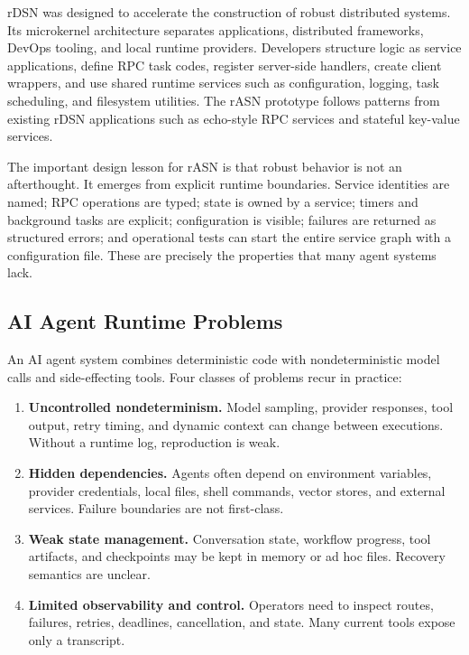 \documentclass[manuscript,screen,review]{acmart}
\newcommand{\rasn}{rASN\xspace}
\newcommand{\rdsn}{rDSN\xspace}
\begin{document}
\rdsn was designed to accelerate the construction of robust distributed
systems. Its microkernel architecture separates applications, distributed
frameworks, DevOps tooling, and local runtime providers. Developers structure
logic as service applications, define RPC task codes, register server-side
handlers, create client wrappers, and use shared runtime services such as
configuration, logging, task scheduling, and filesystem utilities. The \rasn
prototype follows patterns from existing \rdsn applications such as echo-style
RPC services and stateful key-value services.

The important design lesson for \rasn is that robust behavior is not an
afterthought. It emerges from explicit runtime boundaries. Service identities
are named; RPC operations are typed; state is owned by a service; timers and
background tasks are explicit; configuration is visible; failures are returned
as structured errors; and operational tests can start the entire service graph
with a configuration file. These are precisely the properties that many agent
systems lack.

\subsection{AI Agent Runtime Problems}

An AI agent system combines deterministic code with nondeterministic model
calls and side-effecting tools. Four classes of problems recur in practice:

\begin{enumerate}
  \item \textbf{Uncontrolled nondeterminism.} Model sampling, provider
  responses, tool output, retry timing, and dynamic context can change between
  executions. Without a runtime log, reproduction is weak.
  \item \textbf{Hidden dependencies.} Agents often depend on environment
  variables, provider credentials, local files, shell commands, vector stores,
  and external services. Failure boundaries are not first-class.
  \item \textbf{Weak state management.} Conversation state, workflow progress,
  tool artifacts, and checkpoints may be kept in memory or ad hoc files.
  Recovery semantics are unclear.
  \item \textbf{Limited observability and control.} Operators need to inspect
  routes, failures, retries, deadlines, cancellation, and state. Many current
  tools expose only a transcript.
\end{enumerate}
\end{document}
